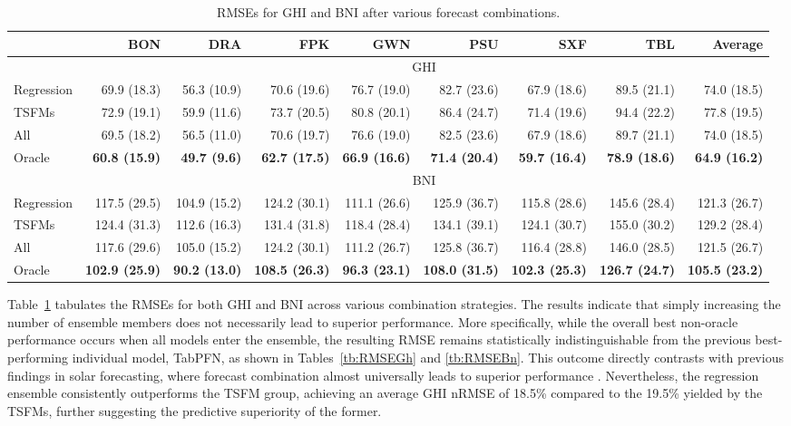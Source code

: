 \documentclass[number, 3p, 10pt, times]{elsarticle}
\begin{document}
\begin{table}
\centering
\footnotesize
\caption{RMSEs for GHI and BNI after various forecast combinations.}
\label{tb:combination}
\begin{tabular}{lrrrrrrrr}
\toprule
 & BON & DRA & FPK & GWN & PSU & SXF & TBL & Average \\
\midrule
& \multicolumn{8}{c}{GHI}\\
Regression & 69.9 (18.3) & 56.3 (10.9) & 70.6 (19.6) & 76.7 (19.0) & 82.7 (23.6) & 67.9 (18.6) & 89.5 (21.1) & 74.0 (18.5) \\
TSFMs & 72.9 (19.1) & 59.9 (11.6) & 73.7 (20.5) & 80.8 (20.1) & 86.4 (24.7) & 71.4 (19.6) & 94.4 (22.2) & 77.8 (19.5) \\
All & 69.5 (18.2) & 56.5 (11.0) & 70.6 (19.7) & 76.6 (19.0) & 82.5 (23.6) & 67.9 (18.6) & 89.7 (21.1) & 74.0 (18.5) \\
Oracle & \textbf{60.8 (15.9)} & \textbf{49.7 (9.6)} & \textbf{62.7 (17.5)} & \textbf{66.9 (16.6)} & \textbf{71.4 (20.4)} & \textbf{59.7 (16.4)} & \textbf{78.9 (18.6)} & \textbf{64.9 (16.2)} \\
\midrule
& \multicolumn{8}{c}{BNI}\\
Regression & 117.5 (29.5) & 104.9 (15.2) & 124.2 (30.1) & 111.1 (26.6) & 125.9 (36.7) & 115.8 (28.6) & 145.6 (28.4) & 121.3 (26.7) \\
TSFMs & 124.4 (31.3) & 112.6 (16.3) & 131.4 (31.8) & 118.4 (28.4) & 134.1 (39.1) & 124.1 (30.7) & 155.0 (30.2) & 129.2 (28.4) \\
All & 117.6 (29.6) & 105.0 (15.2) & 124.2 (30.1) & 111.2 (26.7) & 125.8 (36.7) & 116.4 (28.8) & 146.0 (28.5) & 121.5 (26.7) \\
Oracle & \textbf{102.9 (25.9)} & \textbf{90.2 (13.0)} & \textbf{108.5 (26.3)} & \textbf{96.3 (23.1)} & \textbf{108.0 (31.5)} & \textbf{102.3 (25.3)} & \textbf{126.7 (24.7)} & \textbf{105.5 (23.2)} \\
\bottomrule
\end{tabular}
\end{table}

Table~\ref{tb:combination} tabulates the RMSEs for both GHI and BNI across various combination strategies. The results indicate that simply increasing the number of ensemble members does not necessarily lead to superior performance. More specifically, while the overall best non-oracle performance occurs when all models enter the ensemble, the resulting RMSE remains statistically indistinguishable from the previous best-performing individual model, TabPFN, as shown in Tables~\ref{tb:RMSEGh} and \ref{tb:RMSEBn}. This outcome directly contrasts with previous findings in solar forecasting, where forecast combination almost universally leads to superior performance \citep[e.g.,][]{zhang2026, ZHANG2022111768}. Nevertheless, the regression ensemble consistently outperforms the TSFM group, achieving an average GHI nRMSE of 18.5\% compared to the 19.5\% yielded by the TSFMs, further suggesting the predictive superiority of the former.
\end{document}
